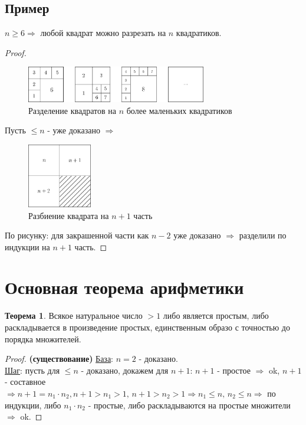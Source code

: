 \documentclass[12pt]{article}
\theoremstyle{definition}
\newtheorem{theorem}{Теорема}
\begin{document}
\subsection*{Пример}
$n \geq 6 \Rightarrow$ любой квадрат можно разрезать на $n$ квадратиков.
\begin{proof}

\begin{figure}[H]
	\centering
	\includegraphics[width = 0.7\textwidth]{3_1.png}
	\caption{Разделение квадратов на $n$ более маленьких квадратиков}
	\label{3_1}
\end{figure}

Пусть $\leq n$ - уже доказано $\Rightarrow$ 

\begin{figure}[H]
	\centering
	\includegraphics[width = 0.25\textwidth]{3_2.png}
	\caption{Разбиение квадрата на $n+1$ часть}
	\label{3_2}
\end{figure}
По рисунку: для закрашенной части как $n-2$ уже доказано $\Rightarrow$  разделили по индукции на $n+1$ часть.
\end{proof}

\section*{Основная теорема арифметики}

\begin{theorem}
	Всякое натуральное число $> 1$ либо является простым, либо раскладывается в произведение простых, единственным образо с точностью до порядка множителей.
\end{theorem}
\begin{proof}
	\textbf{(существование)} \uline{База}: $n=2$ - доказано.\\
	\uline{Шаг}: пусть для $\leq n$ - доказано, докажем для $n+1$: $n+1$ - простое $\Rightarrow$ ok, $n+1$ - составное $\Rightarrow n + 1 = n_1 \cdot n_2, n+1 > n_1 > 1, \, n+1 > n_2 > 1 \Rightarrow n_1 \leq n,\, n_2 \leq n \Rightarrow$ по индукции, либо $n_1\cdot n_2$ - простые, либо раскладываются на простые множители $\Rightarrow$ ok. 
\end{proof}
\end{document}
